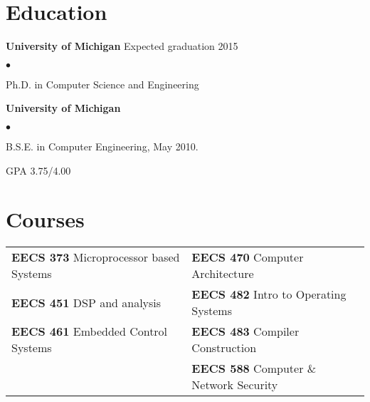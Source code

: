 \documentclass{res}
\newcommand{\sqitem}{\item[\tiny$\blacksquare$]}
\newcommand{\sqlist}{\begin{list}{$\bullet$}
  { \setlength{\itemsep}{0pt}
	\setlength{\parsep}{0pt}
	\setlength{\topsep}{0pt}
	\setlength{\partopsep}{0pt}
	\setlength{\leftmargin}{6.0em}
	\setlength{\labelsep}{2.5em} } }
\newcommand{\sqend}{\end{list}}
\begin{document}

\address{\emph{Current Address}	\\
			1929 Plymouth Rd Apt 3024	\\
			Ann Arbor, MI 48105			\\
										\\
			phone: 734.330.8702			\\
			email: ewust@umich.edu}
\address{\emph{Permanent Address}	\\
			13768 Howen Dr				\\
			Saratoga, CA 95070}

\begin{resume}




\section{Education}
	\textbf{University of Michigan}  Expected graduation 2015%
	\sqlist	
		\sqitem Ph.D. in Computer Science and Engineering 
	\sqend

	\textbf{University of Michigan}
	\sqlist
		\sqitem B.S.E. in Computer Engineering, May 2010.
		\sqitem GPA 3.75/4.00
	\sqend

\section{Courses}
	\begin{tabular}{l l}
	\textbf{EECS 373} Microprocessor based Systems & 
					\textbf{EECS 470} Computer Architecture \\
	\textbf{EECS 451} DSP and analysis & 
					\textbf{EECS 482} Intro to Operating Systems \\
	\textbf{EECS 461} Embedded Control Systems & 
					\textbf{EECS 483} Compiler Construction \\
											  &
					\textbf{EECS 588} Computer \& Network Security \\
	\end{tabular}
\fi


\end{resume}
\end{document}
